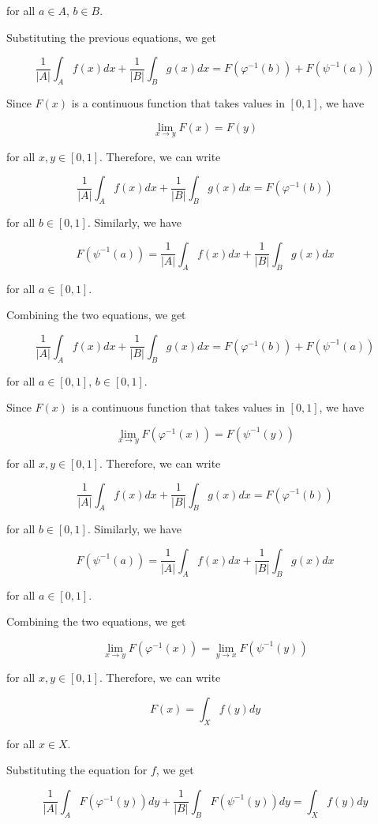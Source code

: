 \documentclass{sazuko}
\begin{document}
for all $a \in A$, $b \in B$.

Substituting the previous equations, we get

$$\frac{1}{|A|} \int_A f(x) dx + \frac{1}{|B|} \int_B g(x) dx =
F(\varphi^{-1}(b)) + F(\psi^{-1}(a))$$

Since $F(x)$ is a continuous function that takes values in $[0, 1]$, we
have

$$\lim_{x \to y} F(x) = F(y)$$

for all $x, y \in [0, 1]$. Therefore, we can write

$$\frac{1}{|A|} \int_A f(x) dx + \frac{1}{|B|} \int_B g(x) dx =
F(\varphi^{-1}(b))$$

for all $b \in [0, 1]$. Similarly, we have

$$F(\psi^{-1}(a)) = \frac{1}{|A|} \int_A f(x) dx + \frac{1}{|B|} \int_B
g(x) dx$$

for all $a \in [0, 1]$.

Combining the two equations, we get

$$\frac{1}{|A|} \int_A f(x) dx + \frac{1}{|B|} \int_B g(x) dx =
F(\varphi^{-1}(b)) + F(\psi^{-1}(a))$$

for all $a \in [0, 1]$, $b \in [0, 1]$.

Since $F(x)$ is a continuous function that takes values in $[0, 1]$, we
have

$$\lim_{x \to y} F(\varphi^{-1}(x)) = F(\psi^{-1}(y))$$

for all $x, y \in [0, 1]$. Therefore, we can write

$$\frac{1}{|A|} \int_A f(x) dx + \frac{1}{|B|} \int_B g(x) dx =
F(\varphi^{-1}(b))$$

for all $b \in [0, 1]$. Similarly, we have

$$F(\psi^{-1}(a)) = \frac{1}{|A|} \int_A f(x) dx + \frac{1}{|B|} \int_B
g(x) dx$$

for all $a \in [0, 1]$.

Combining the two equations, we get

$$\lim_{x \to y} F(\varphi^{-1}(x)) = \lim_{y \to x} F(\psi^{-1}(y))$$

for all $x, y \in [0, 1]$. Therefore, we can write

$$F(x) = \int_X f(y) dy$$

for all $x \in X$.

Substituting the equation for $f$, we get

$$\frac{1}{|A|} \int_A F(\varphi^{-1}(y)) dy + \frac{1}{|B|} \int_B
F(\psi^{-1}(y)) dy = \int_X f(y) dy$$
\end{document}
